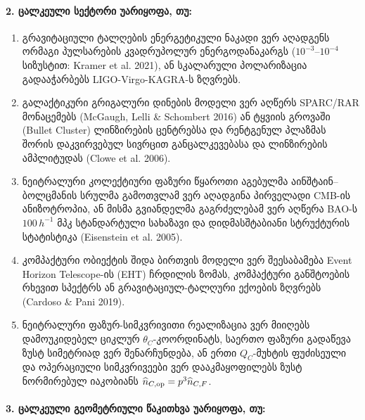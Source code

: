 \documentclass[11pt,a4paper]{article}
\begin{document}
\paragraph{2. ცალკეული სექტორი უარიყოფა, თუ:}

\begin{enumerate}[label=\arabic*.]
\item გრავიტაციული ტალღების ენერგეტიკული ნაკადი ვერ აღადგენს ორმაგი პულსარების კვადრუპოლურ ენერგოდანაკარგს ($10^{-3}$–$10^{-4}$ სიზუსტით: Kramer et al. 2021), ან სკალარული პოლარიზაცია გადააჭარბებს LIGO-Virgo-KAGRA-ს ზღვრებს.
\item გალაქტიკური გრიგალური დინების მოდელი ვერ აღწერს SPARC/RAR მონაცემებს (McGaugh, Lelli \& Schombert 2016) ან ტყვიის გროვაში (Bullet Cluster) ლინზირების ცენტრებსა და რენტგენულ პლაზმას შორის დაკვირვებულ სივრცით განცალკევებასა და ლინზირების ამპლიტუდას (Clowe et al. 2006).
\item ნეიტრალური კოლექტიური ფაზური წყაროთი აგებულმა აინშტაინ–ბოლცმანის სრულმა გამოთვლამ ვერ აღადგინა პირველადი CMB-ის ანიზოტროპია, ან მისმა გვიანდელმა გაგრძელებამ ვერ აღწერა BAO-ს $100\,h^{-1}\text{ მპკ}$ სტანდარტული სახაზავი და დიდმასშტაბიანი სტრუქტურის სტატისტიკა (Eisenstein et al. 2005).
\item კომპაქტური ობიექტის შიდა ბირთვის მოდელი ვერ შეესაბამება Event Horizon Telescope-ის (EHT) ჩრდილის ზომას, კომპაქტური განშტოების რხევით სპექტრს ან გრავიტაციულ-ტალღური ექოების ზღვრებს (Cardoso \& Pani 2019).
\item ნეიტრალური ფაზურ-სიმკვრივითი რეალიზაცია ვერ მიიღებს დამოუკიდებელ ციკლურ $\theta_C$-კოორდინატს, საერთო ფაზური გადაწევა ზუსტ სიმეტრიად ვერ შენარჩუნდება, ან ერთი $Q_C$-მუხტის ფუძისეული და ოპერაციული სიმკვრივეები ვერ დააკმაყოფილებს ზუსტ ნორმირებულ იაკობიანს $\widehat n_{C,{\rm op}}=p^3\widehat n_{C,F}$.

\end{enumerate}
\paragraph{3. ცალკეული გეომეტრიული წაკითხვა უარიყოფა, თუ:}
\end{document}
